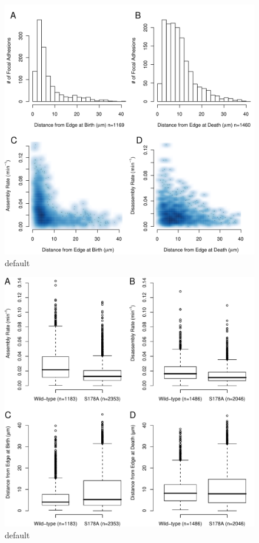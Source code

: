 \documentclass[letterpaper]{article}
\begin{document}
\begin{figure}[htbp]
\begin{center}
\includegraphics[width=\textwidth]{../figures/supplemental/spacial_nofilt}
\caption{default}
\label{default}
\end{center}
\end{figure}

\begin{figure}[htbp]
\begin{center}
\includegraphics{../figures/supplemental/unfilt_S178A_vs_wild-type}
\caption{default}
\label{default}
\end{center}
\end{figure}
\end{document}

